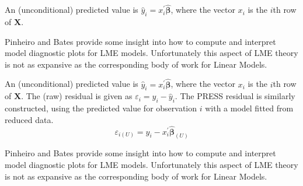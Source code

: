 \documentclass[12pt, a4paper]{report}
\theoremstyle{plain}
\theoremstyle{definition}
\theoremstyle{remark}
\begin{document}
	
	An (unconditional) predicted value is $\hat{y}_i = x^{\prime}_i \boldsymbol{\hat{\beta}}$, where
	the vector $x_i$ is the $i$th row of $\boldsymbol{X}$.
	
	
	
	
	
	Pinheiro and Bates provide some insight into how to compute and interpret model diagnostic plots for LME models. Unfortunately this aspect of LME theory is not as expansive as the corresponding body of work for Linear Models.
	
	
	
	
	An (unconditional) predicted value is $\hat{y}_i = x^{\prime}_i \boldsymbol{\hat{\beta}}$, where
	the vector $x_i$ is the $i$th row of $\boldsymbol{X}$.
	The (raw) residual is given as $\varepsilon_i = y_i - \hat{y}_i$. The PRESS residual is
	similarly constructed, using the predicted value for observation $i$ with a model fitted from reduced data.
	\[ \varepsilon_{i(U)} = y_i - x^{\prime}_i \boldsymbol{\hat{\beta}}_{(U)} \]
	
	
	
	
	Pinheiro and Bates provide some insight into how to compute and interpret model diagnostic plots for LME models. Unfortunately this aspect of LME theory is not as expansive as the corresponding body of work for Linear Models.
	
	
	
	
	
	
	
\end{document}
